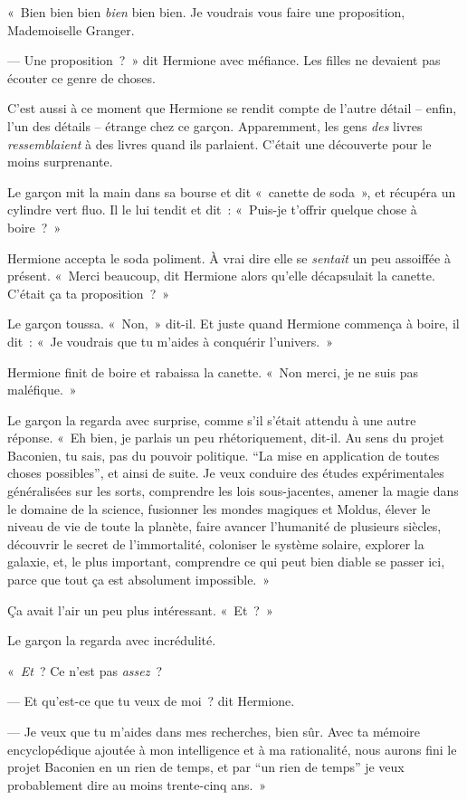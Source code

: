 «~Bien bien bien \emph{bien} bien bien. Je voudrais vous faire une proposition, Mademoiselle Granger.

--- Une proposition~?~» dit Hermione avec méfiance. Les filles ne devaient pas écouter ce genre de choses.

C'est aussi à ce moment que Hermione se rendit compte de l'autre détail -- enfin, l'un des détails -- étrange chez ce garçon. Apparemment, les gens \emph{des} livres \emph{ressemblaient} à des livres quand ils parlaient. C'était une découverte pour le moins surprenante.

Le garçon mit la main dans sa bourse et dit «~canette de soda~», et récupéra un cylindre vert fluo. Il le lui tendit et dit~: «~Puis-je t'offrir quelque chose à boire~?~»

Hermione accepta le soda poliment. À vrai dire elle se \emph{sentait} un peu assoiffée à présent. «~Merci beaucoup, dit Hermione alors qu'elle décapsulait la canette. C'était ça ta proposition~?~»

Le garçon toussa. «~Non,~» dit-il. Et juste quand Hermione commença à boire, il dit~: «~Je voudrais que tu m'aides à conquérir l'univers.~»

Hermione finit de boire et rabaissa la canette. «~Non merci, je ne suis pas maléfique.~»

Le garçon la regarda avec surprise, comme s'il s'était attendu à une autre réponse. «~Eh bien, je parlais un peu rhétoriquement, dit-il. Au sens du projet Baconien, tu sais, pas du pouvoir politique. “La mise en application de toutes choses possibles”, et ainsi de suite. Je veux conduire des études expérimentales généralisées sur les sorts, comprendre les lois sous-jacentes, amener la magie dans le domaine de la science, fusionner les mondes magiques et Moldus, élever le niveau de vie de toute la planète, faire avancer l'humanité de plusieurs siècles, découvrir le secret de l'immortalité, coloniser le système solaire, explorer la galaxie, et, le plus important, comprendre ce qui peut bien diable se passer ici, parce que tout ça est absolument impossible.~»

Ça avait l'air un peu plus intéressant. «~Et~?~»

Le garçon la regarda avec incrédulité.

«~\emph{Et}~? Ce n'est pas \emph{assez}~?

--- Et qu'est-ce que tu veux de moi~? dit Hermione.

--- Je veux que tu m'aides dans mes recherches, bien sûr. Avec ta mémoire encyclopédique ajoutée à mon intelligence et à ma rationalité, nous aurons fini le projet Baconien en un rien de temps, et par “un rien de temps” je veux probablement dire au moins trente-cinq ans.~»

